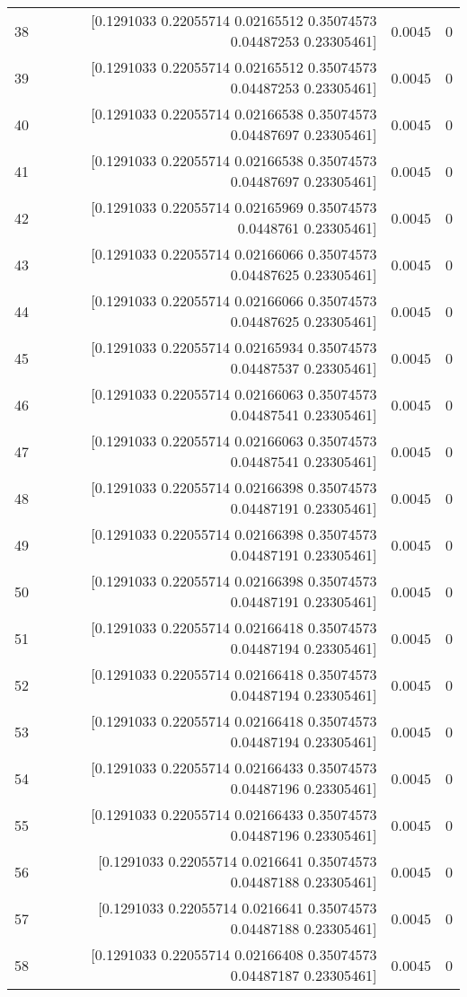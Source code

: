 \begin{longtable}{lrrr}
38 & [0.1291033  0.22055714 0.02165512 0.35074573 0.04487253 0.23305461] & 0.0045 & 0 \\
39 & [0.1291033  0.22055714 0.02165512 0.35074573 0.04487253 0.23305461] & 0.0045 & 0 \\
40 & [0.1291033  0.22055714 0.02166538 0.35074573 0.04487697 0.23305461] & 0.0045 & 0 \\
41 & [0.1291033  0.22055714 0.02166538 0.35074573 0.04487697 0.23305461] & 0.0045 & 0 \\
42 & [0.1291033  0.22055714 0.02165969 0.35074573 0.0448761  0.23305461] & 0.0045 & 0 \\
43 & [0.1291033  0.22055714 0.02166066 0.35074573 0.04487625 0.23305461] & 0.0045 & 0 \\
44 & [0.1291033  0.22055714 0.02166066 0.35074573 0.04487625 0.23305461] & 0.0045 & 0 \\
45 & [0.1291033  0.22055714 0.02165934 0.35074573 0.04487537 0.23305461] & 0.0045 & 0 \\
46 & [0.1291033  0.22055714 0.02166063 0.35074573 0.04487541 0.23305461] & 0.0045 & 0 \\
47 & [0.1291033  0.22055714 0.02166063 0.35074573 0.04487541 0.23305461] & 0.0045 & 0 \\
48 & [0.1291033  0.22055714 0.02166398 0.35074573 0.04487191 0.23305461] & 0.0045 & 0 \\
49 & [0.1291033  0.22055714 0.02166398 0.35074573 0.04487191 0.23305461] & 0.0045 & 0 \\
50 & [0.1291033  0.22055714 0.02166398 0.35074573 0.04487191 0.23305461] & 0.0045 & 0 \\
51 & [0.1291033  0.22055714 0.02166418 0.35074573 0.04487194 0.23305461] & 0.0045 & 0 \\
52 & [0.1291033  0.22055714 0.02166418 0.35074573 0.04487194 0.23305461] & 0.0045 & 0 \\
53 & [0.1291033  0.22055714 0.02166418 0.35074573 0.04487194 0.23305461] & 0.0045 & 0 \\
54 & [0.1291033  0.22055714 0.02166433 0.35074573 0.04487196 0.23305461] & 0.0045 & 0 \\
55 & [0.1291033  0.22055714 0.02166433 0.35074573 0.04487196 0.23305461] & 0.0045 & 0 \\
56 & [0.1291033  0.22055714 0.0216641  0.35074573 0.04487188 0.23305461] & 0.0045 & 0 \\
57 & [0.1291033  0.22055714 0.0216641  0.35074573 0.04487188 0.23305461] & 0.0045 & 0 \\
58 & [0.1291033  0.22055714 0.02166408 0.35074573 0.04487187 0.23305461] & 0.0045 & 0 \\

\end{longtable}
